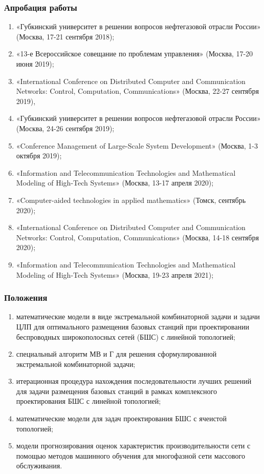 \begin{frame}
    \frametitle{Апробация работы}
    \begin{enumerate} %
        \fontsize{8pt}{7.2}\selectfont
        \item «Губкинский университет в решении вопросов нефтегазовой отрасли России» (Москва, 17-21 сентября 2018); 
        \item «13-е Всероссийское совещание по проблемам управления» (Москва, 17-20 июня 2019); 
        \item «International Conference on Distributed Computer and Communication Networks: Control, Computation, Communications» (Москва, 22-27 сентября 2019), 
        \item «Губкинский университет в решении вопросов нефтегазовой отрасли России» (Москва, 24-26 сентября 2019); 
        \item «Conference Management of Large-Scale System Development» (Москва, 1-3 октября 2019); 
        \item «Information and Telecommunication Technologies and Mathematical Modeling of High-Tech Systems» (Москва, 13-17 апреля 2020); 
        \item «Computer-aided technologies in applied mathematics» (Томск, сентябрь 2020);
        \item «International Conference on Distributed Computer and Communication Networks: Control, Computation, Communications» (Москва, 14-18 сентября 2020); 
        \item «Information and Telecommunication Technologies and Mathematical Modeling of High-Tech Systems» (Москва, 19-23 апреля 2021);
      \end{enumerate}
\end{frame}

\begin{frame}
    \frametitle{Положения}
    \begin{enumerate} %
        \item математические модели в виде экстремальной комбинаторной задачи и
        задачи ЦЛП для оптимального размещения базовых станций при
        проектировании беспроводных широкополосных сетей (БШС) с линейной топологией;
        \item специальный алгоритм МВ и Г для решения сформулированной
        экстремальной комбинаторной задачи;
        \item итерационная процедура нахождения последовательности лучших
        решений для задачи размещения базовых станций в рамках комплексного
        проектирования БШС с линейной топологией;
        \item математические модели для задач проектирования БШС с ячеистой
        топологией;
        \item модели прогнозирования оценок характеристик производительности сети с
        помощью методов машинного обучения для многофазной сети массового обслуживания.
      \end{enumerate}
\end{frame}

